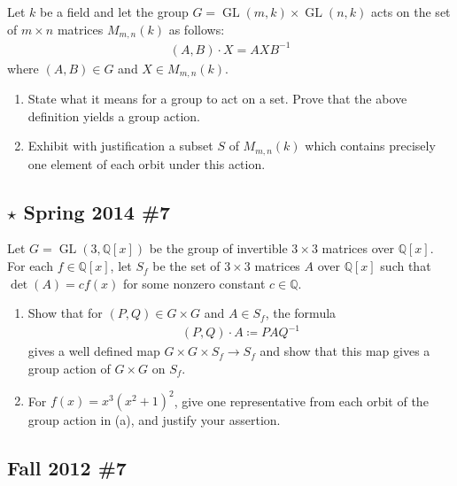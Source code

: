 Let \(k\) be a field and let the group
\(G = \operatorname{GL}(m, k) \times\operatorname{GL}(n, k)\) acts on
the set of \(m\times n\) matrices \(M_{m, n}(k)\) as follows:
\begin{align*}
(A, B) \cdot X = AXB^{-1}
\end{align*}
where \((A, B) \in G\) and \(X\in M_{m, n}(k)\).

\begin{enumerate}
\def\labelenumi{\alph{enumi}.}
\item
  State what it means for a group to act on a set. Prove that the above
  definition yields a group action.
\item
  Exhibit with justification a subset \(S\) of \(M_{m, n}(k)\) which
  contains precisely one element of each orbit under this action.
\end{enumerate}

\hypertarget{star-spring-2014-7}{%
\subsection{\texorpdfstring{\(\star\) Spring 2014
\#7}{\textbackslash star Spring 2014 \#7}}\label{star-spring-2014-7}}

Let \(G = \operatorname{GL}(3, {\mathbb{Q}}[x])\) be the group of
invertible \(3\times 3\) matrices over \({\mathbb{Q}}[x]\). For each
\(f\in {\mathbb{Q}}[x]\), let \(S_f\) be the set of \(3\times 3\)
matrices \(A\) over \({\mathbb{Q}}[x]\) such that
\(\operatorname{det}(A) = c f(x)\) for some nonzero constant
\(c\in {\mathbb{Q}}\).

\begin{enumerate}
\def\labelenumi{\alph{enumi}.}
\item
  Show that for \((P, Q) \in G\times G\) and \(A\in S_f\), the formula
  \begin{align*}
  (P, Q)\cdot A \coloneqq PAQ^{-1}
  \end{align*}
  gives a well defined map \(G\times G \times S_f \to S_f\) and show
  that this map gives a group action of \(G\times G\) on \(S_f\).
\item
  For \(f(x) = x^3(x^2+1)^2\), give one representative from each orbit
  of the group action in (a), and justify your assertion.
\end{enumerate}

\hypertarget{fall-2012-7}{%
\subsection{Fall 2012 \#7}\label{fall-2012-7}}

